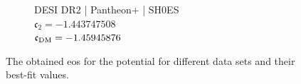 \begin{figure}[htbp]
	\hspace*{\fill}
	\begin{subfigure}[t]{0.49\textwidth}
		\centering
		\resizebox{\linewidth}{!}{%
		}
		\caption{DESI DR2 | Pantheon+ | SH0ES\\$\mathfrak{c}_2 = -1.443747508$\\$\mathfrak{c}_{\textnormal{DM}} = -1.45945876$}
		\label{fig:HyperbolicEoS:PPSD}
	\end{subfigure}
	\hspace*{\fill}

	\tagstructend
	\caption[EoS for hyperbolic potential.]{The obtained \gls{eos} for the  potential for different data sets and their best-fit values.}
	\label{fig:HyperbolicEoS}
\end{figure}

